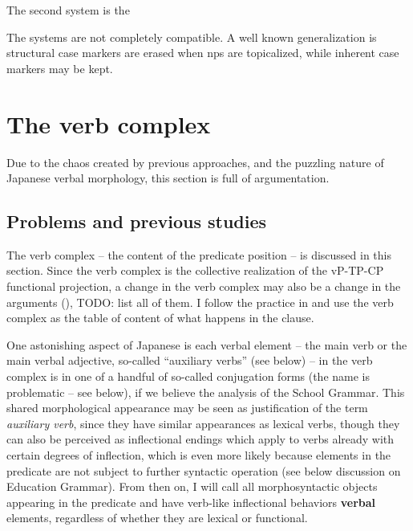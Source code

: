 \documentclass[UTF8, a4paper, oneside, scheme=plain]{ctexart}
\newcommand*{\concept}[1]{\textbf{#1}}
\newcommand*{\term}[1]{\emph{#1}}
\begin{document}
The second system is the 

The systems are not completely compatible.
A well known generalization is structural case markers are erased when \ac{np}s are topicalized,
while inherent case markers may be kept.


\section{The verb complex}

Due to the chaos created by previous approaches,
and the puzzling nature of Japanese verbal morphology,
this section is full of argumentation.

\subsection{Problems and previous studies}\label{sec:verb-complex-overview}

The verb complex -- the content of the predicate position -- is discussed in this section.
Since the verb complex is the collective realization of the vP-TP-CP functional projection,
a change in the verb complex may also be a change in 
the arguments (),
TODO: list all of them.
I follow the practice in \citet{jacques2021grammar}
and use the verb complex as the table of content of what happens in the clause.

One astonishing aspect of Japanese is 
each verbal element -- the main verb or the main verbal adjective, so-called ``auxiliary verbs'' (see below) -- 
in the verb complex is in one of a handful of so-called conjugation forms (the name is problematic -- see below),
if we believe the analysis of the School Grammar.
This shared morphological appearance may be seen as justification of the term \term{auxiliary verb},
since they have similar appearances as lexical verbs,
though they can also be perceived as inflectional endings 
which apply to verbs already with certain degrees of inflection,
which is even more likely 
because elements in the predicate are not subject to further syntactic operation
(see below discussion on Education Grammar).
From then on, I will call all morphosyntactic objects 
appearing in the predicate and have verb-like inflectional behaviors \concept{verbal} elements,
regardless of whether they are lexical or functional.
\end{document}

